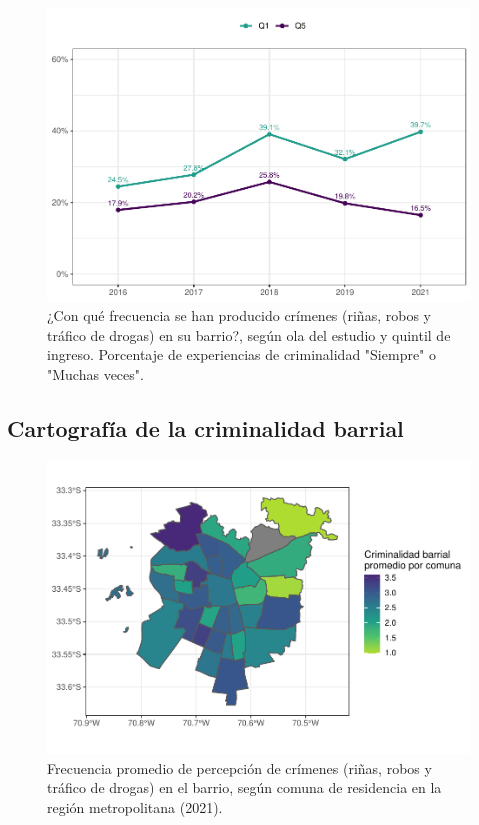 \documentclass[
  12pt,
  openany]{book}
\begin{document}
\begin{figure}

{\centering \includegraphics{reporte-elsoc_files/figure-latex/crim-quintil-1} 

}

\caption{¿Con qué frecuencia se han producido crímenes (riñas, robos y tráfico de drogas) en su barrio?, según ola del estudio y quintil de ingreso. Porcentaje de experiencias de criminalidad "Siempre" o "Muchas veces".}\label{fig:crim-quintil}
\end{figure}

\hypertarget{cartografuxeda-de-la-criminalidad-barrial}{%
\subsection{Cartografía de la criminalidad barrial}\label{cartografuxeda-de-la-criminalidad-barrial}}

\begin{figure}

{\centering \includegraphics{reporte-elsoc_files/figure-latex/crimi-comuna-1} 

}

\caption{Frecuencia promedio de percepción de crímenes (riñas, robos y tráfico de drogas) en el barrio, según comuna de residencia en la región metropolitana (2021).}\label{fig:crimi-comuna}
\end{figure}
\end{document}
